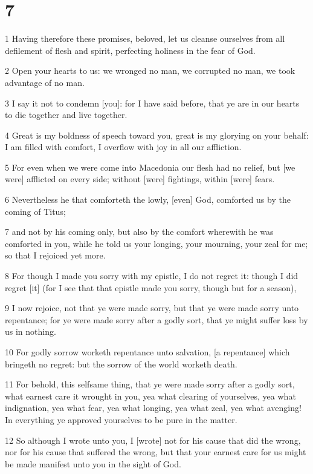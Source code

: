 \chapter{7}

\par 1 Having therefore these promises, beloved, let us cleanse ourselves from all defilement of flesh and spirit, perfecting holiness in the fear of God.
\par 2 Open your hearts to us: we wronged no man, we corrupted no man, we took advantage of no man.
\par 3 I say it not to condemn [you]: for I have said before, that ye are in our hearts to die together and live together.
\par 4 Great is my boldness of speech toward you, great is my glorying on your behalf: I am filled with comfort, I overflow with joy in all our affliction.
\par 5 For even when we were come into Macedonia our flesh had no relief, but [we were] afflicted on every side; without [were] fightings, within [were] fears.
\par 6 Nevertheless he that comforteth the lowly, [even] God, comforted us by the coming of Titus;
\par 7 and not by his coming only, but also by the comfort wherewith he was comforted in you, while he told us your longing, your mourning, your zeal for me; so that I rejoiced yet more.
\par 8 For though I made you sorry with my epistle, I do not regret it: though I did regret [it] (for I see that that epistle made you sorry, though but for a season),
\par 9 I now rejoice, not that ye were made sorry, but that ye were made sorry unto repentance; for ye were made sorry after a godly sort, that ye might suffer loss by us in nothing.
\par 10 For godly sorrow worketh repentance unto salvation, [a repentance] which bringeth no regret: but the sorrow of the world worketh death.
\par 11 For behold, this selfsame thing, that ye were made sorry after a godly sort, what earnest care it wrought in you, yea what clearing of yourselves, yea what indignation, yea what fear, yea what longing, yea what zeal, yea what avenging! In everything ye approved yourselves to be pure in the matter.
\par 12 So although I wrote unto you, I [wrote] not for his cause that did the wrong, nor for his cause that suffered the wrong, but that your earnest care for us might be made manifest unto you in the sight of God.
